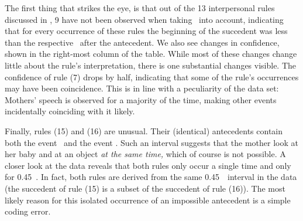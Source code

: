 The first thing that strikes the eye, is that out of the 13 interpersonal rules discussed in \citet{rohlfing_multi-modal_underreview}, 9 have not been observed when taking \rt\ into account, indicating that for every occurrence of these rules the beginning of the succedent was less than the respective \rt\ after the antecedent.
We also see changes in confidence, shown in the right-most column of the table.
While most of these changes change little about the rule's interpretation, there is one substantial changes visible.
The confidence of rule (7) drops by half, indicating that some of the rule's occurrences may have been coincidence.
This is in line with a peculiarity of the data set:
Mothers' speech is observed for a majority of the time, making other events incidentally coinciding with it likely.

Finally, rules (15) and (16) are unusual.
Their (identical) antecedents contain both the event \mogain\ and the event \mogaob.
Such an interval suggests that the mother look at her baby and at an object \emph{at the same time,} which of course is not possible.
A closer look at the data reveals that both rules only occur a single time and only for 0.45~\s.
In fact, both rules are derived from the same 0.45~\s\ interval in the data (the succedent of rule (15) is a subset of the succedent of rule (16)).
The most likely reason for this isolated occurrence of an impossible antecedent is a simple coding error.




































